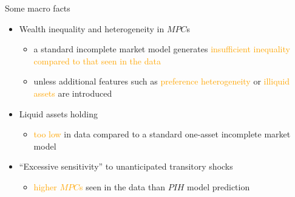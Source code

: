 \documentclass{beamer}
\begin{document}
\begin{frame}{Some macro facts}
	\begin{itemize}
	\item Wealth inequality and heterogeneity in $MPC$s
	\begin{itemize}
		\item a standard incomplete market model generates \textcolor{orange}{insufficient inequality compared to that seen in the data}
		\item unless additional features such as \textcolor{orange}{preference heterogeneity} or \textcolor{orange}{illiquid assets} are introduced 
	\end{itemize}
\pause 
\item Liquid assets holding
\begin{itemize}
	\item \textcolor{orange}{too low} in data compared to a standard one-asset incomplete market model 
\end{itemize}
\item ``Excessive sensitivity'' to unanticipated transitory shocks 
\begin{itemize}
	\item  \textcolor{orange}{higher $MPC$s} seen in the data than $PIH$ model prediction 
\end{itemize}
	\end{itemize}
\end{frame}
\end{document}

